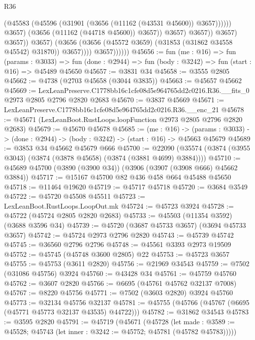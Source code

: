 \begin{lexlean}{R36}
\begin{coremodule}
                                            (@45583
                                              (@45596
                                                (@31901 (@3656 (@11162 (@43531 @45600)) @3657))))))
                                        @3657)
                                      (@3656 (@11162 (@44718 @45600)) @3657))
                                    @3657)
                                  @3657))
                              @3657)
                            @3657))
                        @3657)
                      (@3656 (@3656 (@45572 @3659) (@31853 (@31862 @34558 @45542) @31870)) @3657))))
                @3657))))))
@45656 := fun (me : @16) =>
  fun (params : @3033) =>
  fun (done : @2944) => fun (body : @3242) => fun (start : @16) => @45489 @45650
@45657 := @3831 @34
@45658 := @3555 @2805
@45662 := @4738 (@2703 @45658 (@3044 @3835))
@45663 := @45657 @45662
@45669 := LexLeanPreserve.C1778bb16c1cfe08d5e964765dd2c0216.R36.__fits_0
    @2973
    @2805
    @2796
    @2820
    @2683
@45670 := @3837 @45669
@45671 := LexLeanPreserve.C1778bb16c1cfe08d5e964765dd2c0216.R36.__enc_21
@45678 := @45671 (LexLeanBoot.RustLoops.loopFunction @2973 @2805 @2796 @2820 @2683)
@45679 := @45670 @45678
@45685 := (me : @16) ->
  (params : @3033) -> (done : @2944) -> (body : @3242) -> (start : @16) -> @45663 @45679
@45689 := @3853 @34 @45662 @45679 @666
@45700 := @22090 (@35574 (@3874 (@3955 @3043) (@3874 (@3878 @45658) (@3874 (@3881 @4699) @3884))))
@45710 := @45689 @45700 (@3890 (@3900 @34)) (@3906 (@3907 (@3908 @666) @45662 @3884))
@45717 := @15167 @45700 @82 @436 @458 @664 @45488 @45650
@45718 := @11464 @19620
@45719 := @45717 @45718
@45720 := @3684 @3549
@45722 := @45720 @45508 @45511
@45723 := LexLeanBoot.RustLoops.LoopOut.mk
@45724 := @45723 @3924
@45728 := @45722 (@45724 @2805 @2820 @2683)
@45733 := @45503 (@11354 @3592) (@3688 @3596 @34)
@45739 := @45720 (@3687 @45733 @3657) (@3694 @45733 @3657)
@45742 := @45724 @2973 @2796 @2820
@45743 := @45739 @45742
@45745 := @36560 @2796 @2796
@45748 := @45561 @3393 @2973 @19509
@45752 := @45745 (@45748 @3600 @2805) @22
@45753 := @45723 @3657
@45755 := @45753 (@3611 @2820)
@45756 := @21969 @34543
@45759 := @7502 (@31086 @45756) @3924
@45760 := @43428 @34
@45761 := @45759 @45760
@45762 := @3607 @2820
@45766 := @6695 (@45761 @45762 @32137 @7008)
@45767 := @8220 @45756
@45771 := @7502 (@3603 @2820) @3924 @45760
@45773 := @32134 @45756 @32137
@45781 := @45755 (@45766 (@45767 (@6695 (@45771 @45773 @32137 @43535) @44722)))
@45782 := @31862 @34543
@45783 := @3595 @2820
@45791 := @45719
    (@45671
      (@45728
        (let made : @3589 := @45528; @45743 (let inner : @3242 := @45752; @45781 (@45782 @45783)))))

\end{coremodule}
\end{lexlean}
